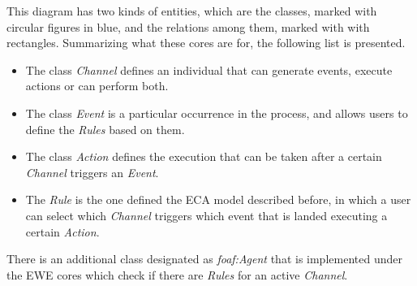 This diagram has two kinds of entities, which are the classes, marked with circular figures in blue, and the relations among them, marked with with rectangles. Summarizing what these cores are for, the following list is presented.

\begin{itemize}
    \item The class \textit{Channel} defines an individual that can generate events, execute actions or can perform both.
    \item The class \textit{Event} is a particular occurrence in the process, and allows users to define the \textit{Rules} based on them.
    \item The class \textit{Action} defines the execution that can be taken after a certain \textit{Channel} triggers an \textit{Event}.
    \item The \textit{Rule} is the one defined the ECA model described before, in which a user can select which \textit{Channel} triggers which event that is landed executing a certain \textit{Action}.
\end{itemize}
There is an additional class designated as \textit{foaf:Agent} that is implemented under the EWE cores which check if there are \textit{Rules} for an active\textit{ Channel}.




